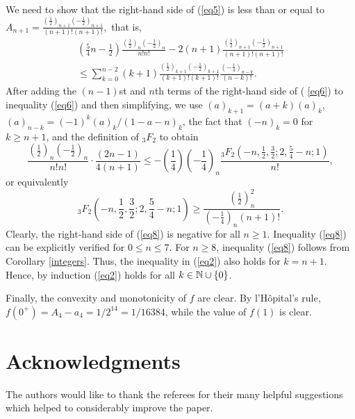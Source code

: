 \documentclass[final]{siamltex}
\begin{document}
We need to show that the right-hand side of (\ref{eq5}) is less than or equal
to $A_{n+1}=\frac{\left( \frac{1}{2}\right) _{n+1}\left( -\frac{1}{2}\right)
_{n+1}}{(n+1)!(n+1)!},$
that is,  
\begin{eqnarray}
\left( \frac{5}{4}n - \frac{1}{2}\right) \frac{\left( \frac{1}{2}\right)
_{n}\left( -\frac{1}{2}\right) _{n}}{n!n!}-2(n+1)\frac{\left( \frac{1}{2}%
\right) _{n+1}\left( -\frac{1}{2}\right) _{n+1}}{(n+1)!(n+1)!}  \label{eq6}  \\ 
\leq \sum\limits_{k=0}^{n-2}(k+1)\frac{\left( \frac{1}{2}\right) _{k+1}\left( -%
\frac{1}{2}\right) _{k+1}}{(k+1)!(k+1)!}\frac{\left( -\frac{1}{4}\right)
_{n-k}}{(n-k)!}.  \nonumber
\end{eqnarray}
After adding the $(n-1)$st and $n$th terms of the right-hand side of (%
\ref{eq6}) to inequality (\ref{eq6}) and then simplifying, we use $%
(a)_{k+1}=(a+k)(a)_{k}$, $(a)_{n-k}=(-1)^{k}(a)_{k}/(1-a-n)_{k}$, the fact that $(-n)_k = 0$ for $k \geq n+1$, and the
definition of $_{3}F_{2}$ to obtain 
\[
\frac{\left( \frac{1}{2}\right) _{n}\left( -\frac{1}{2}\right) _{n}}{n!n!}%
\cdot \frac{(2n-1)}{4(n+1)}\leq -\left( \frac{1}{4}\right) \left( -\frac{1}{4%
}\right) _{n}\frac{_{3}F_{2}\left( -n,\frac{1}{2},\frac{3}{2};2,\frac{5}{4}%
-n;1\right) }{n!},  \label{eq7}
\]
or equivalently 
\begin{equation}
_{3}F_{2}\left( -n,\mbox{$\frac{1}{2}$},\mbox{$\frac{3}{2}$};2,%
\mbox{$\frac{5}{4}$}-n;1\right) \geq \frac{\left( \frac{1}{2}\right) _{n}^{2}%
}{\left( -\frac{1}{4}\right) _{n}(n+1)!}.  \label{eq8}
\end{equation}
Clearly, the right-hand side of (\ref{eq8}) is negative for all $n\geq 1$. 
Inequality (\ref{eq8}) can be explicitly verified for $0\leq n\leq 7$. For 
$n\geq 8$, inequality (\ref{eq8}) follows from Corollary \ref{integers}.  Thus, the inequality in (\ref{eq2}) also holds for $k = n+1$.
Hence, by induction (\ref{eq2}) holds for all $k \in {\Bbb N} \cup \{0\}$.

Finally, the convexity and monotonicity of $f$ are clear.  By l'H\^{o}pital's rule, 
$f(0^{+}) = A_4 - a_4 = 1/2^{14} = 1/16384$, while the value of $f(1)$ is clear.  
\qquad\endproof

\section*{Acknowledgments}

The authors would like to thank the referees for their many helpful 
suggestions which helped to considerably improve the paper.
\end{document}
